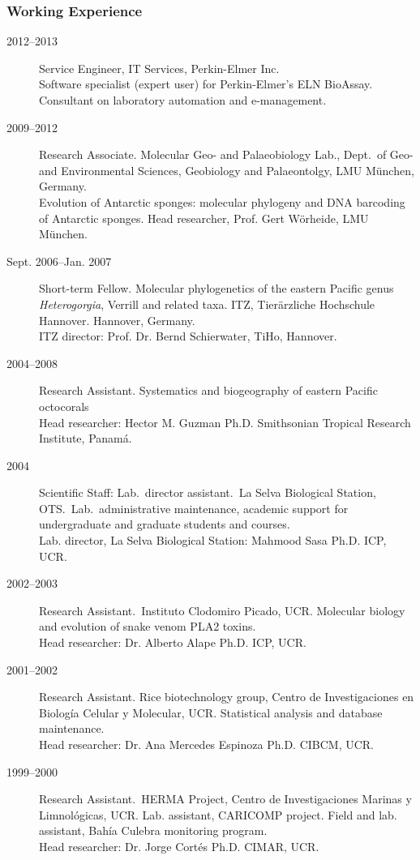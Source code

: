 \documentclass[letter,10pt]{article}
\begin{document}
\subsubsection*{Working Experience}
\begin{description}
\item [2012--2013] Service Engineer, IT Services, Perkin-Elmer Inc.\\Software specialist (expert user) for Perkin-Elmer's ELN BioAssay. Consultant on laboratory automation and e-management.

\item[2009--2012] Research Associate. Molecular Geo- and Palaeobiology Lab., Dept.~of Geo- and Environmental Sciences, Geobiology and Palaeontolgy, LMU M\"unchen, Germany.\\ Evolution of Antarctic sponges: molecular phylogeny and DNA barcoding of Antarctic sponges.
Head researcher, Prof. Gert W\"orheide, LMU M\"unchen.

\item[Sept. 2006--Jan. 2007] Short-term Fellow. Molecular phylogenetics of the eastern Pacific genus \emph{Heterogorgia}, Verrill and related taxa. ITZ, Tier\"arzliche Hochschule Hannover. Hannover, Germany.\\
ITZ director: Prof. Dr. Bernd Schierwater, TiHo, Hannover.

\item[2004--2008] Research Assistant. Systematics and biogeography of eastern Pacific octocorals\\
Head researcher: Hector M. Guzman Ph.D. Smithsonian Tropical Research Institute, Panam\'a.

\item[2004] Scientific Staff: Lab.~director assistant.~La Selva Biological Station, OTS.~Lab.~administrative maintenance, academic support for undergraduate and graduate students and courses.\\
Lab. director, La Selva Biological Station: Mahmood Sasa Ph.D. ICP, UCR.

\item[2002--2003] Research Assistant.~Instituto Clodomiro Picado, UCR. Molecular biology and evolution of snake venom PLA2 toxins.\\
Head researcher: Dr. Alberto Alape Ph.D. ICP, UCR.

\item[2001--2002] Research Assistant. Rice biotechnology group, Centro de Investigaciones en Biolog\'ia Celular y Molecular, UCR.  Statistical analysis and database maintenance.\\
Head researcher: Dr. Ana Mercedes Espinoza Ph.D.  CIBCM, UCR.

\item[1999--2000] Research Assistant.~HERMA Project, Centro de Investigaciones Marinas y Limnol\'ogicas, UCR. Lab. assistant, CARICOMP project. Field and lab. assistant, Bah\'ia Culebra monitoring program.\\
Head researcher: Dr. Jorge Cort\'es Ph.D. CIMAR, UCR.
\end{description}
\end{document}
